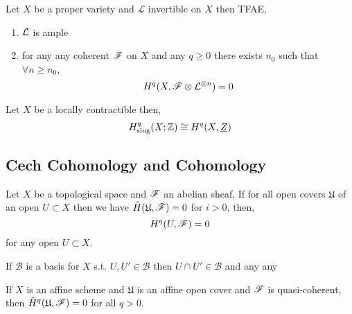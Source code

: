 \documentclass[12pt]{article}
\begin{document}
\begin{theorem}[Serre]
Let $X$ be a proper variety and $\mathcal{L}$ invertible on $X$ then TFAE,
\begin{enumerate}
\item $\mathcal{L}$ is ample
\item for any any coherent $\mathscr{F}$ on $X$ and any $q \ge 0$ there exists $n_0$ such that $\forall n \ge n_0$,  
\[ H^q(X, \mathscr{F} \otimes \mathcal{L}^{\otimes n}) = 0 \]
\end{enumerate}
\end{theorem}

\begin{theorem}
Let $X$ be a locally contractible then,
\[ H^q_{\text{sing}}(X ; \mathbb{Z}) \cong H^q(X, \underline{Z}) \]
\end{theorem}

\subsection{Cech Cohomology and Cohomology}

\begin{lemma}
Let $X$ be a topological space and $\mathscr{F}$ an abelian sheaf, If for all open covers $\mathfrak{U}$ of an open $U \subset X$ then we have $\check{H}(\mathfrak{U}, \mathscr{F}) = 0$ for $i > 0$, then,
\[ H^q(U, \mathscr{F}) = 0 \]
for any open $U \subset X$. 
\end{lemma}

\begin{lemma}
If $\mathcal{B}$ is a basis for $X$ s.t. $U, U' \in \mathcal{B}$ then $U \cap U' \in \mathcal{B}$ and any any 
\end{lemma}

\begin{lemma}
If $X$ is an affine scheme and $\mathfrak{U}$ is an affine open cover and $\mathscr{F}$ is quasi-coherent, then $\check{H}^q(\mathfrak{U}, \mathscr{F}) = 0$ for all $q > 0$.
\end{lemma}
\end{document}
